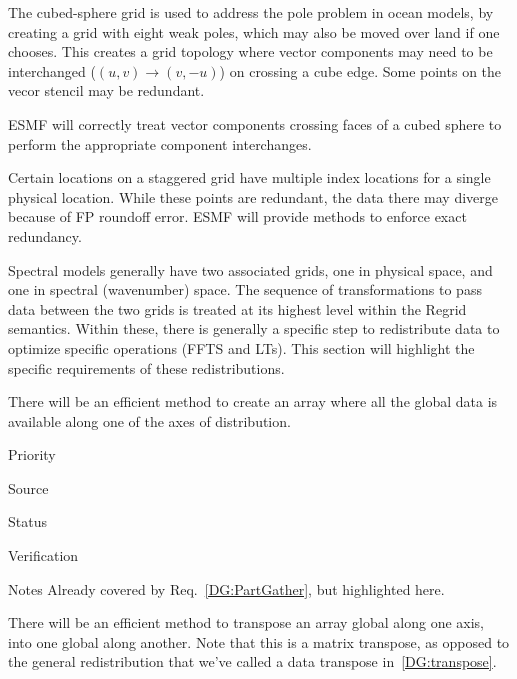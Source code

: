 
The cubed-sphere grid \cite{ref:rpm1996} is used to address the pole
problem in ocean models, by creating a grid with eight weak poles,
which may also be moved over land if one chooses. This creates a grid
topology where vector components may need to be interchanged
($(u,v)\longrightarrow(v,-u)$) on crossing a cube edge. Some points on
the vecor stencil may be redundant.


ESMF will correctly treat vector components crossing faces of a cubed
sphere to perform the appropriate component interchanges.


Certain locations on a staggered grid have multiple index locations
for a single physical location. While these points are redundant, the
data there may diverge because of FP roundoff error. ESMF will provide
methods to enforce exact redundancy.


Spectral models generally have two associated grids, one in physical
space, and one in spectral (wavenumber) space. The sequence of
transformations to pass data between the two grids is treated at its
highest level within the Regrid semantics. Within these, there is
generally a specific step to redistribute data to optimize specific
operations (FFTS and LTs). This section will highlight the specific
requirements of these redistributions.


There will be an efficient method to create an array where all the
global data is available along one of the axes of distribution.

\begin{reqlist}
\item[Priority]
\item[Source]
\item[Status]
\item[Verification]
\item[Notes] Already covered by Req.~\ref{DG:PartGather}, but
  highlighted here.
\end{reqlist}


There will be an efficient method to transpose an array global along
one axis, into one global along another. Note that this is a matrix
transpose, as opposed to the general redistribution that we've called
a data transpose in~\ref{DG:transpose}.

